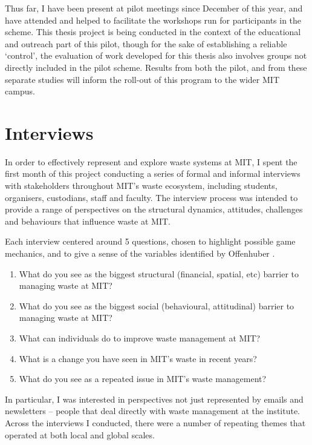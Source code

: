 \documentclass[nofonts,nols,justified,nobib]{tufte-book}
\begin{document}
Thus far, I have been present at pilot meetings since December of this year, and have attended and helped to facilitate the workshops run for participants in the scheme. This thesis project is being conducted in the context of the educational and outreach part of this pilot, though for the sake of establishing a reliable `control', the evaluation of work developed for this thesis also involves groups not directly included in the pilot scheme. Results from both the pilot, and from these separate studies will inform the roll-out of this program to the wider MIT campus. 

\section*{Interviews}

In order to effectively represent and explore waste systems at MIT, I spent the first month of this project conducting a series of formal and informal interviews with stakeholders throughout MIT's waste ecosystem, including students, organisers, custodians, staff and faculty. The interview process was intended to provide a range of perspectives on the structural dynamics, attitudes, challenges and behaviours that influence waste at MIT.

Each interview centered around 5 questions, chosen to highlight possible game mechanics, and to give a sense of the variables identified by Offenhuber \cite{offenhuber_waste_2017}.

\begin{enumerate}
\item What do you see as the biggest structural (financial, spatial, etc) barrier to managing waste at MIT?
\item What do you see as the biggest social (behavioural, attitudinal) barrier to managing waste at MIT?
\item What can individuals do to improve waste management at MIT?
\item What is a change you have seen in MIT's waste in recent years?
\item What do you see as a repeated issue in MIT's waste management?
\end{enumerate}



In particular, I was interested in perspectives not just represented by emails and newsletters -- people that deal directly with waste management at the institute. Across the interviews I conducted, there were a number of repeating themes that operated at both local and global scales.
\end{document}
